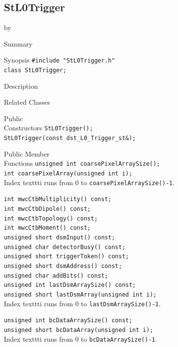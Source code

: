 \documentclass[twoside]{article}
\newcommand{\entrylabel}[1]{\mbox{\textbf{{#1}}}\hfil}%
\newenvironment{entry}
{\begin{list}{}%
    {\renewcommand{\makelabel}{\entrylabel}%
     \setlength{\labelwidth}{90pt}%
     \setlength{\leftmargin}{\labelwidth}
     \advance\leftmargin by \labelsep%
      }%
    }%
  {\end{list}}
\newcommand{\Entrylabel}[1]%
{\raisebox{0pt}[1ex][0pt]{\makebox[\labelwidth][l]%
    {\parbox[t]{\labelwidth}{\hspace{0pt}\textbf{{#1}}}}}}
\newenvironment{Entry}%
{\renewcommand{\entrylabel}{\Entrylabel}\begin{entry}}%
  {\end{entry}}
\begin{document}
\subsection{StL0Trigger}
\label{sec:StL0Trigger}
\begin{Entry}
\item[Summary]
\item[Synopsis]
    \verb+#include "StL0Trigger.h"+\\
    \verb+class StL0Trigger;+\\
\item[Description]
\item[Related Classes]
\item[Public\\ Constructors]
    \verb+StL0Trigger();+\\
    \verb+StL0Trigger(const dst_L0_Trigger_st&);+\\
\item[Public Member\\ Functions]
    \verb+unsigned int coarsePixelArraySize();+\\
    \verb+int coarsePixelArray(unsigned int i);+\\
    Index texttt{i} runs from 0 to \texttt{coarsePixelArraySize()-1}.
    
    \verb+int mwcCtbMultiplicity() const;+\\
    \verb+int mwcCtbDipole() const;+\\
    \verb+int mwcCtbTopology() const;+\\
    \verb+int mwcCtbMoment() const;+\\
    \verb+unsigned short dsmInput() const;+\\
    \verb+unsigned char detectorBusy() const;+\\ 
    \verb+unsigned short triggerToken() const;+\\
    \verb+unsigned short dsmAddress() const;+\\  
    \verb+unsigned char addBits() const;+\\
    \verb+unsigned int lastDsmArraySize() const;+\\

    \verb+unsigned short lastDsmArray(unsigned int i);+\\
    Index texttt{i} runs from 0 to \texttt{lastDsmArraySize()-1}.
    
    \verb+unsigned int bcDataArraySize() const;+\\
    \verb+unsigned short bcDataArray(unsigned int i);+\\
    Index texttt{i} runs from 0 to \texttt{bcDataArraySize()-1}.


\end{Entry}
\end{document}
